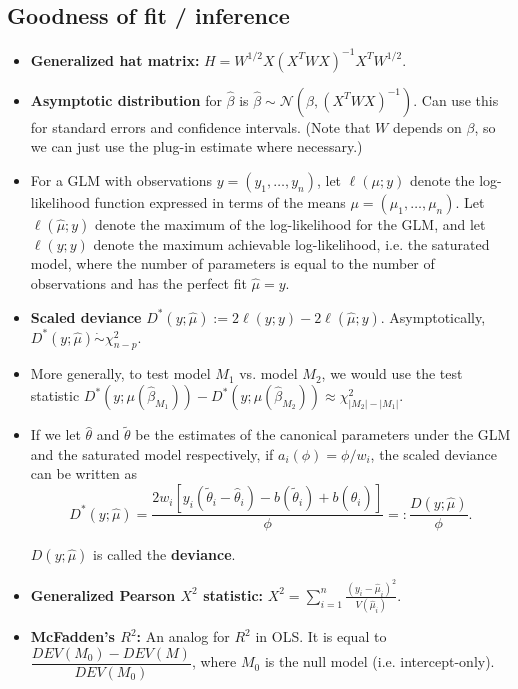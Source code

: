 \documentclass[twoside]{article}
\newcommand\dis{\displaystyle}
\newcommand\calN{\mathcal{N}}
\def\t{\theta}
\begin{document}
\subsection{Goodness of fit / inference}
\begin{itemize}
\item \textbf{Generalized hat matrix:} $H = W^{1/2}X(X^T W X)^{-1} X^T W^{1/2}$.

\item \textbf{Asymptotic distribution} for $\hat{\beta}$ is $\hat{\beta} \sim \calN(\beta, (X^T W X)^{-1})$. Can use this for standard errors and confidence intervals. (Note that $W$ depends on $\beta$, so we can just use the plug-in estimate where necessary.)

\item For a GLM with observations $y = (y_1, \dots, y_n)$, let $\ell(\mu; y)$ denote the log-likelihood function expressed in terms of the means $\mu = (\mu_1, \dots, \mu_n)$. Let $\ell(\hat{\mu};y)$ denote the maximum of the log-likelihood for the GLM, and let $\ell(y;y)$ denote the maximum achievable log-likelihood, i.e. the saturated model, where the number of parameters is equal to the number of observations and has the perfect fit $\hat{\mu} = y$.

\item \textbf{Scaled deviance} $D^*(y;\hat{\mu}) := 2 \ell(y;y) - 2 \ell(\hat{\mu};y)$. Asymptotically, $D^*(y;\hat{\mu}) \dot{\sim} \chi_{n-p}^2$.

\item More generally, to test model $M_1$ vs. model $M_2$, we would use the test statistic $D^*(y; \mu(\hat{\beta}_{M_1})) - D^*(y; \mu(\hat{\beta}_{M_2})) \approx \chi_{|M_2|-|M_1|}^2$.

\item If we let $\hat{\t}$ and $\tilde{\t}$ be the estimates of the canonical parameters under the GLM and the saturated model respectively, if $a_i(\phi) = \phi/w_i$, the scaled deviance can be written as
\[D^*(y;\hat{\mu}) = \frac{2w_i[y_i (\tilde{\t}_i - \hat{\t}_i) - b(\tilde{\t}_i) + b(\hat{\t}_i)]}{\phi} =: \frac{D(y; \hat{\mu})}{\phi}.\]

$D(y; \hat{\mu})$ is called the \textbf{deviance}.

\item \textbf{Generalized Pearson $X^2$ statistic:} $X^2 = \dis\sum_{i=1}^n \frac{(y_i - \hat{\mu}_i)^2}{V(\hat{\mu}_i)}$.

\item \textbf{McFadden's $R^2$:} An analog for $R^2$ in OLS. It is equal to $\dfrac{DEV(M_0) - DEV(M)}{DEV(M_0)}$, where $M_0$ is the null model (i.e. intercept-only).


\end{itemize}
\end{document}
